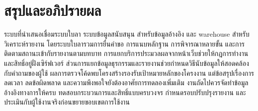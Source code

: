 \section{สรุปและอภิปรายผล}
ระบบที่นำเสนอเชื่อมระบบใบลา ระบบข้อมูลสนับสนุน สำหรับข้อมูลอ้างอิง
และ warehouse สำหรับวิเคราะห์รายงาน โดยระบบใบลารวมการยื่นคำขอ
การแนบหลักฐาน การพิจารณาหลายขั้น
และการติดตามสถานะเข้ากับรายงานตามบทบาท
การแยกบริการประมวลผลจากหน้าเว็บช่วยให้กฎการทำงานและสิทธิ์อยู่ฝั่งเซิร์ฟเวอร์
ส่วนการแยกข้อมูลธุรกรรมและรายงานช่วยกำหนดวิธีนับข้อมูลให้สอดคล้องกับคำถามของผู้ใช้
ผลการตรวจโค้ดพบโครงสร้างรองรับเป้าหมายหลักของโครงงาน
แต่ข้อสรุปเรื่องการลดเวลา ลดข้อผิดพลาด
และความพึงพอใจยังต้องอาศัยการทดลองเพิ่มเติม
งานถัดไปควรจัดทำข้อมูลอ้างอิงทางการให้ครบ
ทดสอบกระบวนการและสิทธิ์แบบครบวงจร กำหนดรอบปรับปรุงรายงาน
และประเมินกับผู้ใช้งานจริงก่อนขยายขอบเขตการใช้งาน
